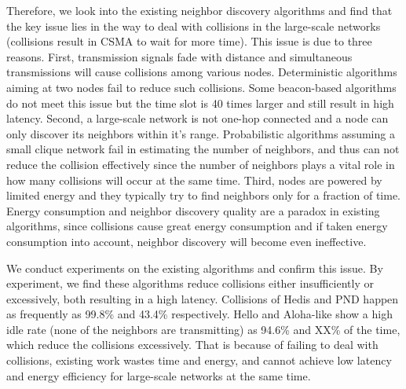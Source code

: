Therefore, we look into the existing neighbor discovery algorithms and find that the key issue lies in the way to deal with collisions in the large-scale networks (collisions result in CSMA \cite{bianchi1996performance} to wait for more time).
This issue is due to three reasons.
First, transmission signals fade with distance and simultaneous transmissions will cause collisions among various nodes. Deterministic algorithms aiming at two nodes \cite{kandhalu2010u, chen2015heterogeneous} fail to reduce such collisions. Some beacon-based algorithms \cite{dutta2008practical, bakht2012searchlight, sun2014hello} do not meet this issue but the time slot is 40 times larger and still result in high latency. 
Second, a large-scale network is not one-hop connected and a node can only discover its neighbors within it's range. Probabilistic algorithms \cite{vasudevan2009neighbor, you2011aloha, song2014probabilistic} assuming a small clique network fail in estimating the number of neighbors, and thus can not reduce the collision effectively since the number of neighbors plays a vital role in how many collisions will occur at the same time. 
Third, nodes are powered by limited energy and they typically try to find neighbors only for a fraction of time. Energy consumption and neighbor discovery quality are a paradox in existing algorithms, since collisions cause great energy consumption and if taken energy consumption into account, neighbor discovery will become even ineffective.

We conduct experiments on the existing algorithms \cite{dutta2008practical,kandhalu2010u,
bakht2012searchlight,sun2014hello,chen2015heterogeneous} and confirm this issue.
By experiment, we find these algorithms reduce collisions either insufficiently or excessively, both resulting in a high latency.
Collisions of Hedis \cite{chen2015heterogeneous} and PND \cite{song2014probabilistic} happen as frequently as 99.8\% and 43.4\% respectively. Hello \cite{sun2014hello} and Aloha-like \cite{you2011aloha} show a high idle rate (none of the neighbors are transmitting) as 94.6\% and XX\% of the time, which reduce the collisions excessively.  %
That is because of failing to deal with collisions, existing work wastes time and energy, and cannot achieve low latency and energy efficiency for large-scale networks at the same time.

